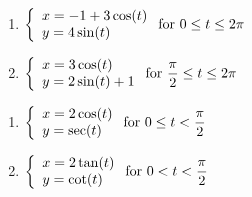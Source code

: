 \begin{multicols}{2} \raggedcolumns 
\begin{enumerate}
\setcounter{enumi}{\value{HW}}

\item ${\displaystyle \left\{ \begin{array}{l} x = -1+ 3\cos(t) \\ y = 4\sin(t) \end{array} \right. \vspace{.25in} \mbox{for } 0 \leq t \leq 2\pi}$
\item ${\displaystyle \left\{ \begin{array}{l} x = 3\cos(t) \\ y = 2\sin(t)+1 \end{array} \right. \vspace{.25in} \mbox{for } \dfrac{\pi}{2} \leq t \leq 2\pi}$

\setcounter{HW}{\value{enumi}}
\end{enumerate}
\end{multicols}

\begin{multicols}{2} \raggedcolumns 
\begin{enumerate}
\setcounter{enumi}{\value{HW}}

\item ${\displaystyle \left\{ \begin{array}{l} x = 2\cos(t) \\ y = \sec(t) \end{array} \right. \vspace{.25in} \mbox{for } 0 \leq t < \dfrac{\pi}{2}}$
\item ${\displaystyle \left\{ \begin{array}{l} x = 2\tan(t) \\ y = \cot(t) \end{array} \right. \vspace{.25in} \mbox{for } 0 < t < \dfrac{\pi}{2}}$

\setcounter{HW}{\value{enumi}}
\end{enumerate}
\end{multicols}


